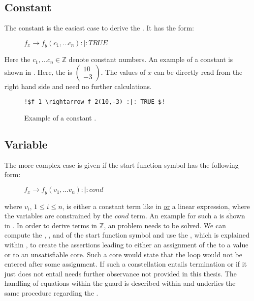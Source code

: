 \subsection{Constant \stem}
\label{sec:stem-const}
The constant \stem is the easiest case to derive the \stem. It has the form: 
\begin{figure}[H]
	\centering
	$f_x \rightarrow f_y(c_1,\dots c_n) :|: TRUE$
\end{figure} 
Here the $c_1,\dots c_n \in \mathbb{Z}$ denote constant numbers. \newline
An example of a constant \stem is shown in . Here, the \stem is $\begin{pmatrix}10\\-3\end{pmatrix}$.
The values of $x$ can be directly read from the right hand side and need no further calculations.
\begin{figure}[H]
	\begin{lstlisting}[escapechar=!]
	!$f_1 \rightarrow f_2(10,-3) :|: TRUE $!
	\end{lstlisting}	
	\caption{Example of a constant \stem.}
	\label{lst:stem-cons}
\end{figure}

\subsection{Variable \stem}
\label{sec:stem-var}
The more complex case is given if the start function symbol has the following form:
\begin{figure}[H]
	\centering
	$f_x \rightarrow f_y(v_1, \dots v_n) :|: cond$
\end{figure}
where $v_i$, $1 \le i \le n$, is either a constant term like in  \underline{or} a linear expression, where the variables are constrained by the $cond$ term. An example for such a \stem is shown in . In order to derive terms in $\mathbb{Z}$, an  problem needs to be solved. We can compute the \guardmatrix, \guardconstants, \updatematrix and \updateconstants of the start function symbol and use the \smtfactory, which is explained within , to create the assertions leading to either an assignment of the \stem to a value or to an unsatisfiable core. Such a core would state that the  loop would not be entered after some assignment. If such a constellation entails termination or if it just does not entail \nonterm needs further observance not provided in this thesis. \newline
The handling of equations within the guard is described within  and underlies the same procedure regarding the \stem.

